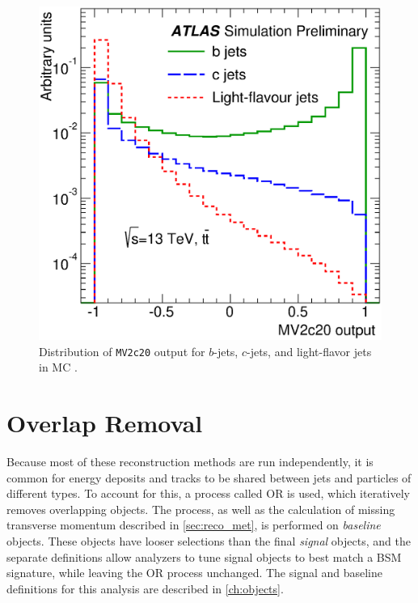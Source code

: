 \begin{centering}
\begin{figure}[!hbt]
\myfloatalign
\includegraphics[width=.9\linewidth]{figures/reco/fig_08.eps}
\caption{ Distribution of \texttt{MV2c20} output for $b$-jets, $c$-jets, and light-flavor jets in \ttbar \ac{MC} \cite{ATL-PHYS-PUB-2015-022}. }
\label{fig:reco_mv2}
\end{figure}
\end{centering}

\section{Overlap Removal}
\label{sec:reco_or}

Because most of these reconstruction methods are run independently, it is common for energy deposits and tracks to be shared between jets and particles of different types. To account for this, a process called \acf{OR} is used, which iteratively removes overlapping objects. The process, as well as the calculation of missing transverse momentum described in \autoref{sec:reco_met}, is performed on \textit{baseline} objects. These objects have looser selections than the final \textit{signal} objects, and the separate definitions allow analyzers to tune signal objects to best match a \ac{BSM} signature, while leaving the \ac{OR} process unchanged. The signal and baseline definitions for this analysis are described in \autoref{ch:objects}.

